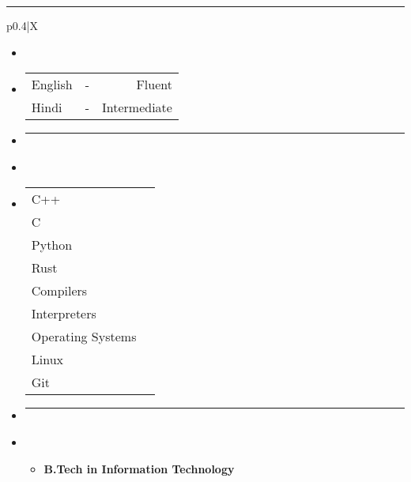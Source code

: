 \documentclass[12pt]{article}
\newcommand{\primarycolor}{red}
\newcommand{\myprogress}[1]{\progressbar[width=3.1cm,roundnessr=0,filledcolor=black,emptycolor=white,subdivisions=1]{#1}}
\newcommand{\mysection}[1]{{\large\color{\primarycolor}{#1}}}
\begin{document}
    \vspace{2ex}
    \hrule
    \renewcommand{\labelitemi}{}
    \renewcommand{\labelitemii}{}
    \renewcommand{\labelitemiii}{}
    \noindent\begin{tabularx}{\textwidth}{p{0.4\hsize}|X}
        \vspace{0.5ex}\\
        \noindent\begin{itemize}[itemsep=1.5ex,leftmargin=-0.1ex]
            \item\vspace{-5.5ex}{\mysection{Languages}}
            \item
                {\begin{tabularx}{0.4\textwidth}{X c r}
                    English &-& Fluent \\
                    Hindi &-& Intermediate \\
                \end{tabularx}}
            \item{\begin{center}\rule{0.4\textwidth}{0.5pt}\end{center}}
            \item{\mysection{Skills}}
            \item
                {\renewcommand{\arraystretch}{1.4}
                \begin{tabularx}{0\textwidth}{p{}>{\raggedleft\arraybackslash}X}
                    {C++} & \myprogress{1} \\
                    {C} & \myprogress{0.9} \\
                    {Python} & \myprogress{0.7} \\
                    {Rust} & \myprogress{0.4} \\
                    {Compilers} & \myprogress{0.7} \\
                    {Interpreters} & \myprogress{0.8} \\
                    {Operating Systems} & \myprogress{0.6} \\
                    {Linux} & \myprogress{0.7} \\
                    {Git} & \myprogress{0.7} \\
                \end{tabularx}}
            \item{\begin{center}\rule{0.4\textwidth}{0.5pt}\end{center}}
            \item{\mysection{Education}}
                {\begin{itemize}[itemsep=0.5ex,leftmargin=-0.1ex,rightmargin=1ex]
                    \item\textbf{B.Tech in Information Technology}


\end{itemize}}
\end{itemize}
\end{tabularx}
\end{document}
